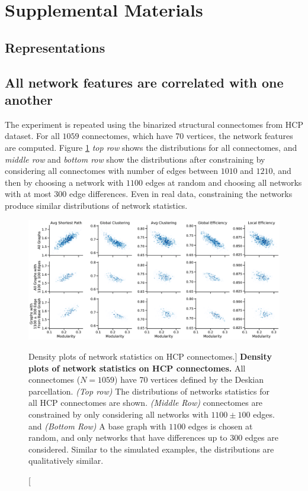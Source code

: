 \section{Supplemental Materials}
\subsection{Representations}
\subsection{All network features are correlated with one another}\label{sec:bag-of-features-hcp}
The experiment is repeated using the binarized structural connectomes from HCP dataset. For all $1059$ connectomes, which have 70 vertices, the network features are computed. Figure \ref{fig:exp6_hcp} \textit{top row} shows the distributions for all connectomes, and \textit{middle row} and \textit{bottom row} show the distributions after constraining by considering all connectomes with number of edges between $1010$ and $1210$, and then by choosing a network with $1100$ edges at random and choosing all networks with at most $300$ edge differences. Even in real data, constraining the networks produce similar distributions of network statistics. 

\begin{figure}[b!]
    \centering
    \includegraphics[width=\textwidth]{figures/dnd/exp6_hcp.pdf}
    \caption
    [Density plots of network statistics on HCP connectomes.]
    {\textbf{Density plots of network statistics on HCP connectomes.} All connectomes ($N=1059$) have 70 vertices defined by the Deskian parcellation. 
    \textit{(Top row)} The distributions of networks statistics for all HCP connectomes are shown.
    \textit{(Middle Row)} connectomes are constrained by only considering all networks with $1100 \pm 100$ edges.
    and \textit{(Bottom Row)} A base graph with $1100$ edges is chosen at random, and only networks that have differences up to $300$ edges are considered. Similar to the simulated examples, the distributions are qualitatively similar.}
    \label{fig:exp6_hcp}
\end{figure}


